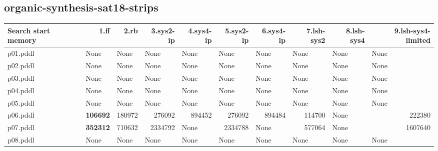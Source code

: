 \documentclass{article}
\begin{document}
\hypertarget{search_start_memory-organic-synthesis-sat18-strips}{}
\subsection*{organic-synthesis-sat18-strips}

\begin{tabular}{@{}lrrrrrrrrr@{}}
Search start memory & 1.ff & 2.rb & 3.sys2-ip & 4.sys4-ip & 5.sys2-lp & 6.sys4-lp & 7.lsh-sys2 & 8.lsh-sys4 & 9.lsh-sys4-limited \\
\midrule
p01.pddl & \multicolumn{1}{|l|}{None} & \multicolumn{1}{|l|}{None} & \multicolumn{1}{|l|}{None} & \multicolumn{1}{|l|}{None} & \multicolumn{1}{|l|}{None} & \multicolumn{1}{|l|}{None} & \multicolumn{1}{|l|}{None} & \multicolumn{1}{|l|}{None} & \multicolumn{1}{|l|}{None} \\
p02.pddl & \multicolumn{1}{|l|}{None} & \multicolumn{1}{|l|}{None} & \multicolumn{1}{|l|}{None} & \multicolumn{1}{|l|}{None} & \multicolumn{1}{|l|}{None} & \multicolumn{1}{|l|}{None} & \multicolumn{1}{|l|}{None} & \multicolumn{1}{|l|}{None} & \multicolumn{1}{|l|}{None} \\
p03.pddl & \multicolumn{1}{|l|}{None} & \multicolumn{1}{|l|}{None} & \multicolumn{1}{|l|}{None} & \multicolumn{1}{|l|}{None} & \multicolumn{1}{|l|}{None} & \multicolumn{1}{|l|}{None} & \multicolumn{1}{|l|}{None} & \multicolumn{1}{|l|}{None} & \multicolumn{1}{|l|}{None} \\
p04.pddl & \multicolumn{1}{|l|}{None} & \multicolumn{1}{|l|}{None} & \multicolumn{1}{|l|}{None} & \multicolumn{1}{|l|}{None} & \multicolumn{1}{|l|}{None} & \multicolumn{1}{|l|}{None} & \multicolumn{1}{|l|}{None} & \multicolumn{1}{|l|}{None} & \multicolumn{1}{|l|}{None} \\
p05.pddl & \multicolumn{1}{|l|}{None} & \multicolumn{1}{|l|}{None} & \multicolumn{1}{|l|}{None} & \multicolumn{1}{|l|}{None} & \multicolumn{1}{|l|}{None} & \multicolumn{1}{|l|}{None} & \multicolumn{1}{|l|}{None} & \multicolumn{1}{|l|}{None} & \multicolumn{1}{|l|}{None} \\
p06.pddl & \textbf{106692} & 180972 & 276092 & 894452 & 276092 & 894484 & 114700 & \multicolumn{1}{|l|}{None} & 222380 \\
p07.pddl & \textbf{352312} & 710632 & 2334792 & \multicolumn{1}{|l|}{None} & 2334788 & \multicolumn{1}{|l|}{None} & 577064 & \multicolumn{1}{|l|}{None} & 1607640 \\
p08.pddl & \multicolumn{1}{|l|}{None} & \multicolumn{1}{|l|}{None} & \multicolumn{1}{|l|}{None} & \multicolumn{1}{|l|}{None} & \multicolumn{1}{|l|}{None} & \multicolumn{1}{|l|}{None} & \multicolumn{1}{|l|}{None} & \multicolumn{1}{|l|}{None} & \multicolumn{1}{|l|}{None} \\

\end{tabular}
\end{document}
